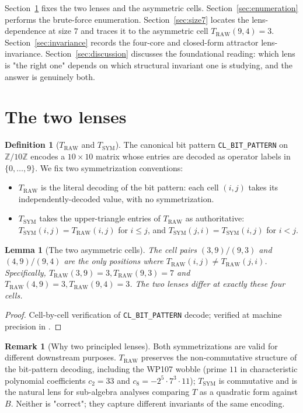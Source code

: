 \documentclass[11pt,reqno]{amsart}
\newtheorem{lemma}[theorem]{Lemma}
\theoremstyle{definition}
\newtheorem{definition}[theorem]{Definition}
\newtheorem{remark}[theorem]{Remark}
\newcommand{\Z}{\mathbb{Z}}
\newcommand{\TRAW}{T_{\mathrm{RAW}}}
\newcommand{\TSYM}{T_{\mathrm{SYM}}}
\newcommand{\TSML}{T}
\newcommand{\BHML}{B}
\begin{document}
Section~\ref{sec:lenses} fixes the two lenses and the asymmetric
cells. Section~\ref{sec:enumeration} performs the brute-force
enumeration. Section~\ref{sec:size7} locates the lens-dependence at
size $7$ and traces it to the asymmetric cell $\TRAW(9, 4) = 3$.
Section~\ref{sec:invariance} records the four-core and closed-form
attractor lens-invariance. Section~\ref{sec:discussion} discusses
the foundational reading: which lens is "the right one" depends on
which structural invariant one is studying, and the answer is
genuinely both.

\section{The two lenses}
\label{sec:lenses}

\begin{definition}[$\TRAW$ and $\TSYM$]
\label{def:lenses}
The canonical bit pattern \texttt{CL\_BIT\_PATTERN} on $\Z/10\Z$
encodes a $10 \times 10$ matrix whose entries are decoded as
operator labels in $\{0, \ldots, 9\}$. We fix two symmetrization
conventions:
\begin{itemize}[leftmargin=*]
\item $\TRAW$ is the literal decoding of the bit pattern: each cell
  $(i, j)$ takes its independently-decoded value, with no
  symmetrization.
\item $\TSYM$ takes the upper-triangle entries of $\TRAW$ as
  authoritative: $\TSYM(i, j) = \TRAW(i, j)$ for $i \leq j$, and
  $\TSYM(j, i) = \TSYM(i, j)$ for $i < j$.
\end{itemize}
\end{definition}

\begin{lemma}[The two asymmetric cells]
\label{lem:asymmetric}
The cell pairs $(3, 9)/(9, 3)$ and $(4, 9)/(9, 4)$ are the only
positions where $\TRAW(i, j) \neq \TRAW(j, i)$. Specifically,
$\TRAW(3, 9) = 3, \TRAW(9, 3) = 7$ and $\TRAW(4, 9) = 3,
\TRAW(9, 4) = 3$. The two lenses differ at exactly these four
cells.
\end{lemma}

\begin{proof}
Cell-by-cell verification of \texttt{CL\_BIT\_PATTERN} decode;
verified at machine precision in
\cite{Gen13Foundations}.
\end{proof}

\begin{remark}[Why two principled lenses]
\label{rem:why-two-lenses}
Both symmetrizations are valid for different downstream purposes.
$\TRAW$ preserves the non-commutative structure of the
bit-pattern decoding, including the WP107 wobble (prime $11$ in
characteristic polynomial coefficients $c_2 = 33$ and $c_8 =
-2^5 \cdot 7^3 \cdot 11$); $\TSYM$ is commutative and is the
natural lens for sub-algebra analyses comparing $\TSML$ as a
quadratic form against $\BHML$. Neither is "correct"; they
capture different invariants of the same encoding.
\end{remark}
\end{document}
